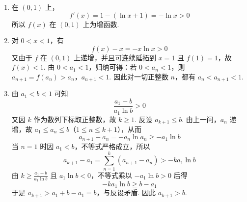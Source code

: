\begin{solution}
\begin{enumerate}
\item 在 \((0,1)\) 上，
\[
f'(x)=1-(\ln x+1)=-\ln x>0
\]
所以 \(f(x)\) 在 \((0,1)\) 上为增函数.
\item 对 \(0<x<1\)，有
\[
f(x)-x=-x\ln x>0
\]
又由于 \(f\) 在 \((0,1)\) 上递增，并且可连续延拓到 \(x=1\) 且 \(f(1)=1\)，故 \(f(x)<1\). 由 \(0<a_1<1\)，归纳可得：若 \(0<a_n<1\)，则
\(a_{n+1}=f(a_n)>a_n\)，\(a_{n+1}<1\).
因此对一切正整数 \(n\)，都有 \(a_n<a_{n+1}<1\).
\item 由 \(a_1<b<1\) 可知
\[
\frac{a_1-b}{a_1\ln b}>0
\]
又因 \(k\) 作为数列下标取正整数，故 \(k\geqslant1\). 反设 \(a_{k+1}\leqslant b\). 由上一问，\(a_n\) 递增，故 \(a_1\leqslant a_n\leqslant b\)（\(1\leqslant n\leqslant k+1\)），从而
\[
a_{n+1}-a_n=-a_n\ln a_n\geqslant-a_1\ln b
\]
当 \(n=1\) 时因 \(a_1<b\)，不等式严格成立，所以
\[
a_{k+1}-a_1=\sum_{n=1}^{k}(a_{n+1}-a_n)>-ka_1\ln b
\]
由 \(k\geqslant\frac{a_1-b}{a_1\ln b}\) 且 \(a_1\ln b<0\)，不等式乘以 \(-a_1\ln b>0\) 后得
\[
-ka_1\ln b\geqslant b-a_1
\]
于是 \(a_{k+1}>a_1+b-a_1=b\)，与反设矛盾. 因此 \(a_{k+1}>b\).
\end{enumerate}
\end{solution}
